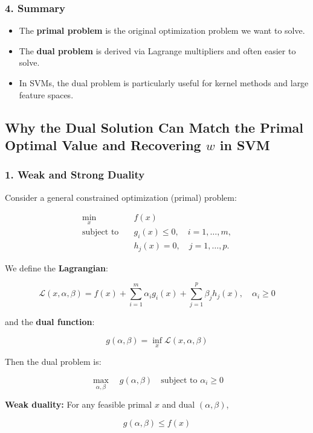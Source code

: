\subsubsection*{4. Summary}

\begin{itemize}
    \item The \textbf{primal problem} is the original optimization problem we want to solve.
    \item The \textbf{dual problem} is derived via Lagrange multipliers and often easier to solve.
    \item In SVMs, the dual problem is particularly useful for kernel methods and large feature spaces.
\end{itemize}

\subsection{Why the Dual Solution Can Match the Primal Optimal Value and Recovering $w$ in SVM}

\subsubsection*{1. Weak and Strong Duality}

Consider a general constrained optimization (primal) problem:

\[
\begin{aligned}
\min_{x} \quad & f(x) \\
\text{subject to} \quad & g_i(x) \le 0, \quad i=1,\dots,m, \\
& h_j(x) = 0, \quad j=1,\dots,p.
\end{aligned}
\]

We define the \textbf{Lagrangian}:

\[
\mathcal{L}(x, \alpha, \beta) = f(x) + \sum_{i=1}^m \alpha_i g_i(x) + \sum_{j=1}^p \beta_j h_j(x), 
\quad \alpha_i \ge 0
\]

and the \textbf{dual function}:

\[
g(\alpha, \beta) = \inf_x \mathcal{L}(x, \alpha, \beta)
\]

Then the dual problem is:

\[
\max_{\alpha, \beta} \quad g(\alpha, \beta) \quad \text{subject to } \alpha_i \ge 0
\]

\textbf{Weak duality:} For any feasible primal $x$ and dual $(\alpha, \beta)$, 

\[
g(\alpha, \beta) \le f(x)
\]

